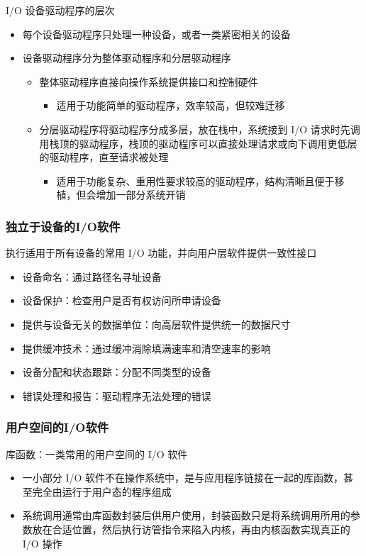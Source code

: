 \documentclass[cs4size,a4paper,10pt]{ctexart}
\begin{document}
	I/O 设备驱动程序的层次
	\begin{itemize}
		\item 每个设备驱动程序只处理一种设备，或者一类紧密相关的设备
		\item 设备驱动程序分为整体驱动程序和分层驱动程序
		\begin{itemize}
			\item 整体驱动程序直接向操作系统提供接口和控制硬件
			\begin{itemize}
				\item 适用于功能简单的驱动程序，效率较高，但较难迁移
			\end{itemize}
			\item 分层驱动程序将驱动程序分成多层，放在栈中，系统接到 I/O 请求时先调用栈顶的驱动程序，栈顶的驱动程序可以直接处理请求或向下调用更低层的驱动程序，直至请求被处理
			\begin{itemize}
				\item 适用于功能复杂、重用性要求较高的驱动程序，结构清晰且便于移植，但会增加一部分系统开销
			\end{itemize}
		\end{itemize}
	\end{itemize}

	\subsubsection{独立于设备的I/O软件}
	执行适用于所有设备的常用 I/O 功能，并向用户层软件提供一致性接口
	\begin{itemize}
		\item 设备命名：通过路径名寻址设备
		\item 设备保护：检查用户是否有权访问所申请设备
		\item 提供与设备无关的数据单位：向高层软件提供统一的数据尺寸
		\item 提供缓冲技术：通过缓冲消除填满速率和清空速率的影响
		\item 设备分配和状态跟踪：分配不同类型的设备
		\item 错误处理和报告：驱动程序无法处理的错误
	\end{itemize}

	\subsubsection{用户空间的I/O软件}
	库函数：一类常用的用户空间的 I/O 软件
	\begin{itemize}
		\item 一小部分 I/O 软件不在操作系统中，是与应用程序链接在一起的库函数，甚至完全由运行于用户态的程序组成
		\item 系统调用通常由库函数封装后供用户使用，封装函数只是将系统调用所用的参数放在合适位置，然后执行访管指令来陷入内核，再由内核函数实现真正的 I/O 操作
	\end{itemize}
\end{document}
